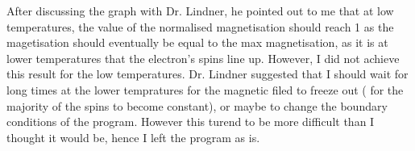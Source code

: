 \documentclass{article}
\begin{document}
After discussing the graph with Dr. Lindner, he pointed out to me that at low temperatures, the value of the normalised magnetisation should reach 1 as the magetisation should eventually be equal to the max magnetisation, as it is at lower temperatures that the electron's spins line up. However, I did not achieve this result for the low temperatures. Dr. Lindner suggested that I should wait for long times at the lower tempratures for the magnetic filed to freeze out ( for the majority of the spins to become constant), or maybe to change the boundary conditions of the program. However this turend to be more difficult than I thought it would be, hence I left the program as is.



      
   
  
\end{document}
